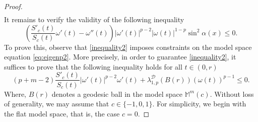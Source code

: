 \documentclass{article}
\begin{document}
\begin{proof}
\begin{equation}
\begin{aligned}
\end{aligned}
\end{equation}
It remains to verify the validity of the following inequality
\begin{equation}\label{inequality2}
\left( \frac{S'_c(t)}{S_c(t)}\omega'(t) - \omega''(t) \right)  |\omega'(t)|^{p-2} |\omega(t)|^{1-p} \sin^2\! \alpha(x) \leq 0.
\end{equation}
To prove this, observe that \eqref{inequality2} imposes constraints on the model space equation \eqref{eq:eigenp2}. More precisely, in order to guarantee \eqref{inequality2}, it suffices to prove that the following inequality holds for all $t\in(0,r)$
\begin{equation}\label{restricmodel}
        \left( p+m-2 \right)\frac{S'_c(t)}{S_c(t)}|\omega'(t)|^{p-2}\omega'(t) + \lambda_{1,p}^{\mathcal{D}}(B(r))(\omega(t))^{p-1} \leq 0.
\end{equation}
Where, $B(r)$ denotes a geodesic ball in the model space $\mathbb{M}^m(c)$. Without loss of generality, we may assume that $c\in\{-1,0,1\}$. For simplicity, we begin with the flat model space, that is, the case $c=0$.


\end{proof}
\end{document}
